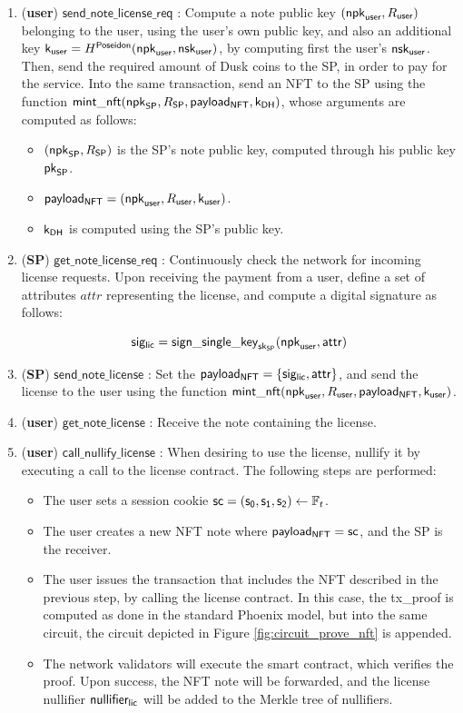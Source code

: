 \begin{enumerate}
	\item (\textbf{user}) $\mathsf{send\_note\_license\_req}$ : Compute a note public key $(\mathsf{npk}_{\mathsf{user}}, R_{\mathsf{user}})$ belonging to the user, using the user's own public key, and also an additional key $\mathsf{k}_{\mathsf{user}} = H^\mathsf{Poseidon}(\mathsf{npk}_{\mathsf{user}}, \mathsf{nsk}_{\mathsf{user}})$, by computing first the user's $\mathsf{nsk}_{\mathsf{user}}$. Then, send the required amount of Dusk coins to the SP, in order to pay for the service. Into the same transaction, send an NFT to the SP using the function $\mathsf{mint\_nft}(\mathsf{npk}_{\mathsf{SP}}, R_{\mathsf{SP}}, \mathsf{payload_{NFT}}, \mathsf{k_{DH}})$, whose arguments are computed as follows:
	\begin{itemize}
		\item $(\mathsf{npk}_{\mathsf{SP}}, R_{\mathsf{SP}})$ is the SP's note public key, computed through his public key $\mathsf{pk}_{\mathsf{SP}}$.
		\item $\mathsf{payload_{NFT}} = (\mathsf{npk}_{\mathsf{user}}, R_{\mathsf{user}}, \mathsf{k}_{\mathsf{user}})$.
		\item $\mathsf{k_{DH}}$ is computed using the SP's public key.
	\end{itemize}

	\item (\textbf{SP}) $\mathsf{get\_note\_license\_req}$ : Continuously check the network for incoming license requests. Upon receiving the payment from a user, define a set of attributes $attr$ representing the license, and compute a digital signature as follows:

	$$\mathsf{sig_{lic}}= \mathsf{sign\_single\_key}_{\mathsf{sk}_{\mathsf{SP}}}(\mathsf{npk}_{\mathsf{user}}, \mathsf{attr})$$

	\item (\textbf{SP}) $\mathsf{send\_note\_license}$ : Set the $\mathsf{payload_{NFT}} = \{\mathsf{sig_{lic}}, \mathsf{attr}\}$, and send the license to the user using the function $\mathsf{mint\_nft}(\mathsf{npk}_{\mathsf{user}}, R_{\mathsf{user}}, \mathsf{payload_{NFT}}, \mathsf{k}_{\mathsf{user}})$.

	\item (\textbf{user}) $\mathsf{get\_note\_license}$ : Receive the note containing the license. 

	\item (\textbf{user}) $\mathsf{call\_nullify\_license}$ : When desiring to use the license, nullify it by executing a call to the license contract. The following steps are performed:

	\begin{itemize}
		\item The user sets a session cookie $\mathsf{sc} = (\mathsf{s_0}, \mathsf{s_1}, \mathsf{s_2}) \leftarrow \mathbb{F}_t$.
		\item The user creates a new NFT note where $\mathsf{payload_{NFT}} = \mathsf{sc}$, and the SP is the receiver.
		\item The user issues the transaction that includes the NFT described in the previous step, by calling the license contract. In this case, the \textsf{tx\_proof} is computed as done in the standard Phoenix model, but into the same circuit, the circuit depicted in Figure \ref{fig:circuit_prove_nft} is appended.
		\item The network validators will execute the smart contract, which verifies the proof. Upon success, the NFT note will be forwarded, and the license nullifier $\mathsf{nullifier_{lic}}$ will be added to the Merkle tree of nullifiers.
	\end{itemize}


\end{enumerate}
